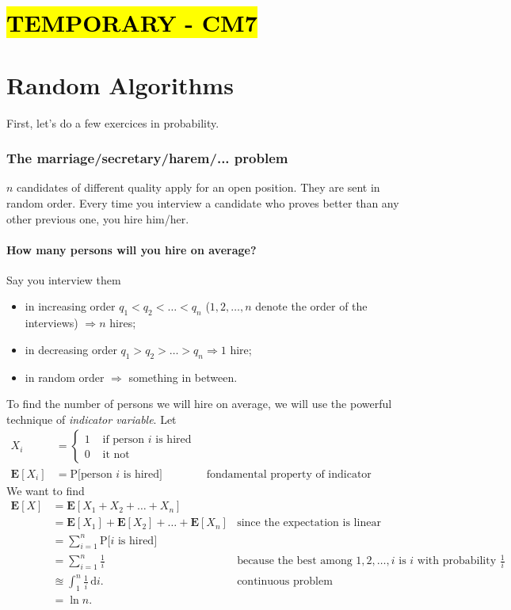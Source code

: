 \part*{\hl{TEMPORARY - CM7}}

\part{Random Algorithms}

First, let's do a few exercices in probability.

\section{The marriage/secretary/harem/... problem}
$n$ candidates of different quality apply for an open position. They are sent in random order. Every time you interview a candidate who proves better than any other previous one, you hire him/her.

\subsection{How many persons will you hire on average?}
Say you interview them 
\begin{itemize}
\item in increasing order $q_1 < q_2 < \ldots < q_n$ ($1,2, \ldots, n$ denote the order of the interviews) $\Rightarrow n$ hires;
\item in decreasing order $q_1 > q_2 > \ldots > q_n \Rightarrow 1$ hire;
\item in random order $\Rightarrow$ something in between.
\end{itemize}
To find the number of persons we will hire on average, we will use the powerful technique of \textit{indicator variable}. Let
\begin{align*}
X_i &=
  \left\{
      \begin{aligned}
      	1 &\text{ if person $i$ is hired} \\
        0 &\text{ it not }
      \end{aligned}
    \right.\\
\mathbf{E}[X_i] &= \text{P[person $i$ is hired}] &\text{ fondamental property of indicator variable}
\end{align*}
We want to find
\begin{align*}
\mathbf{E}[X] &=  \mathbf{E}[X_1+X_2+\ldots+X_n] & \\
&=  \mathbf{E}[X_1] + \mathbf{E}[X_2] + \ldots +\mathbf{E}[X_n]  &\text{since the expectation is linear}\\
&= \sum_{i=1}^n \text{P[$i$ is hired]} &\\
&= \sum_{i=1}^n \frac{1}{i} &\text{because the best among $1,2,\ldots,i$ is $i$ with probability $\frac{1}{i}$}\\
&\approxeq \int_1^n \frac{1}{i}  \, \mathrm{d}i. &\text{continuous problem}\\
&= \ln n. &
\end{align*}

